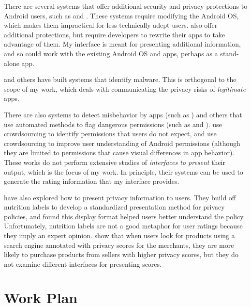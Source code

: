 \documentclass[11pt]{article}
\begin{document}
There are several systems that offer additional 
security and privacy protections to Android users, such as 
\citet{mockDroid-HOTMOBILE11} and \citet{TISSA-Trust11}. 
These systems require modifying
the Android OS, which makes them impractical
for less technically adept users. 
\citet{dr-android-hide-SPSM12} also offer additional
protections, but require developers to rewrite their
apps to take advantage of them.
My interface is meant
for presenting additional information, and so could work
with the existing Android OS and apps, perhaps as a stand-alone app.

\citet{android-repackaged-CODASPY12} and others have
built systems that identify
malware. This is orthogonal to the scope of my work, which
deals with communicating the privacy risks of \emph{legitimate} apps.

There are also systems to detect misbehavior by apps (such as
\citet{taintDroid-OSDI10})
and others that use
automated methods to flag dangerous permissions (such as \citet{droidrisk-2013} 
and \citet{whyper-SEC13}). \citet{expect-purpose-UbiComp12}
use crowdsourcing to identify permissions that users do not expect,
and \citet{droidganger-SPSM12} use crowdsourcing to improve user 
understanding of Android permissions (although they are limited
to permissions that cause visual differences in app behavior). 
These works do not perform
extensive studies of \emph{interfaces to present} their output, which
is the focus of my work. In principle, their systems can be used to
generate the rating information that my interface provides.

\citet{nutrition-labels-SOUPS09} have also explored how to 
present privacy information to users.
They build off nutrition labels to develop a standardized 
presentation method for privacy policies, and found this 
display format helped users better understand the policy. 
Unfortunately, nutrition labels are not a good 
metaphor for user ratings because they imply an expert 
opinion. \citet{privacy-purchasing-effect-INFORMS11} 
show that when users look for products using a search engine 
annotated with privacy scores for the merchants, they are more 
likely to purchase products from sellers with higher privacy scores,
but they do not examine different interfaces for presenting
scores.


\section{Work Plan}
\end{document}
